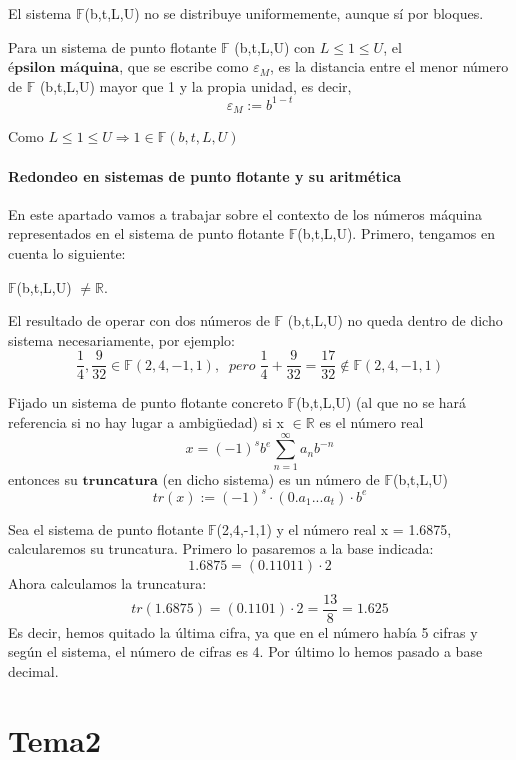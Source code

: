 El sistema $\mathbb{F}$(b,t,L,U) no se distribuye uniformemente, aunque sí por bloques.

\begin{ndef}
Para un sistema de punto flotante $\mathbb{F}$ (b,t,L,U) con $L \leq 1 \leq U$, el $\textbf{épsilon máquina}$, que se escribe como $\varepsilon _M$, es la distancia entre el menor número de $\mathbb{F}$ (b,t,L,U) mayor que 1 y la propia unidad, es decir,
\[ \varepsilon _M := b^{1-t} \]
\end{ndef}

Como $L \leq 1 \leq U \Rightarrow 1 \in \mathbb{F} (b,t,L,U)$ 

\subsection{Redondeo en sistemas de punto flotante y su aritmética}
En este apartado vamos a trabajar sobre el contexto de los números máquina representados en el sistema de punto flotante $\mathbb{F}$(b,t,L,U). Primero, tengamos en cuenta lo siguiente:
	\begin{nlist}
	\item $\mathbb{F}$(b,t,L,U) $\neq \mathbb{R}$.
	\item El resultado de operar con dos números de $\mathbb{F}$ (b,t,L,U) no queda dentro de dicho sistema necesariamente, por ejemplo:
	\[ \frac{1}{4}, \frac{9}{32} \in \mathbb{F} (2,4,-1,1), \; \; pero \; \frac{1}{4} + \frac{9}{32} = \frac{17}{32} \notin \mathbb{F} (2,4,-1,1) \]
	\end{nlist}

\begin{ndef}[Truncatura]
Fijado un sistema de punto flotante concreto $\mathbb{F}$(b,t,L,U) (al que no se hará referencia si no hay lugar a ambigüedad) si x $\in \mathbb{R}$ es el número real 
\[ x =(-1)^sb^e \sum_{n=1}^{\infty} a_nb^{-n} \]
entonces su $\textbf{truncatura}$ (en dicho sistema) es un número de $\mathbb{F}$(b,t,L,U)
\[ tr(x) := (-1)^s \cdot (0.a_1...a_t) \cdot b^e \]
\end{ndef}

\begin{ejemplo}
Sea el sistema de punto flotante $\mathbb{F}$(2,4,-1,1) y el número real x = 1.6875, calcularemos su truncatura. Primero lo pasaremos a la base indicada:
\[ 1.6875 = (0.11011) \cdot 2 \]
Ahora calculamos la truncatura:
\[ tr(1.6875) = (0.1101) \cdot 2 = \frac{13}{8} = 1.625 \]
Es decir, hemos quitado la última cifra, ya que en el número había 5 cifras y según el sistema, el número de cifras es 4. Por último lo hemos pasado a base decimal.
\end{ejemplo}

\part{Tema2}


